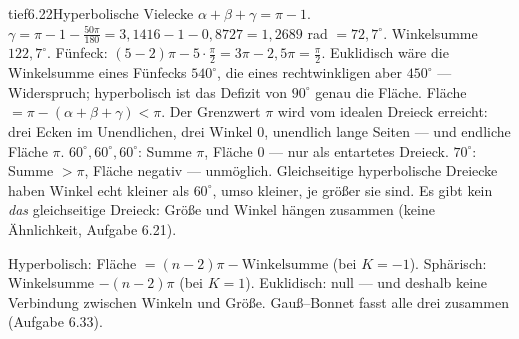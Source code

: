 \begin{loesungkarte}{tief}{6.22}{Hyperbolische Vielecke}
$\alpha + \beta + \gamma = \pi - 1$. $\gamma = \pi - 1 - \frac{50\pi}{180} = 3{,}1416 - 1 - 0{,}8727 = 1{,}2689$ rad $= 72{,}7^{\circ}$. Winkelsumme $122{,}7^{\circ}$.
Fünfeck: $(5 - 2)\pi - 5\cdot\frac\pi2 = 3\pi - 2{,}5\pi = \frac\pi2$. Euklidisch wäre die Winkelsumme eines Fünfecks $540^{\circ}$, die eines rechtwinkligen aber $450^{\circ}$ --- Widerspruch; hyperbolisch ist das Defizit von $90^{\circ}$ genau die Fläche.
Fläche $= \pi - (\alpha + \beta + \gamma) < \pi$. Der Grenzwert $\pi$ wird vom idealen Dreieck erreicht: drei Ecken im Unendlichen, drei Winkel $0$, unendlich lange Seiten --- und endliche Fläche $\pi$.
$60^{\circ}, 60^{\circ}, 60^{\circ}$: Summe $\pi$, Fläche $0$ --- nur als entartetes Dreieck. $70^{\circ}$: Summe $> \pi$, Fläche negativ --- unmöglich. Gleichseitige hyperbolische Dreiecke haben Winkel echt kleiner als $60^{\circ}$, umso kleiner, je größer sie sind. Es gibt kein \emph{das} gleichseitige Dreieck: Größe und Winkel hängen zusammen (keine Ähnlichkeit, Aufgabe 6.21).
\begin{mitnehmen}\kastentext
Hyperbolisch: Fläche $= (n - 2)\pi - \text{Winkelsumme}$ (bei $K = -1$). Sphärisch: Winkelsumme $- (n - 2)\pi$ (bei $K = 1$). Euklidisch: null --- und deshalb keine Verbindung zwischen Winkeln und Größe. Gauß--Bonnet fasst alle drei zusammen (Aufgabe 6.33).
\end{mitnehmen}
\end{loesungkarte}

